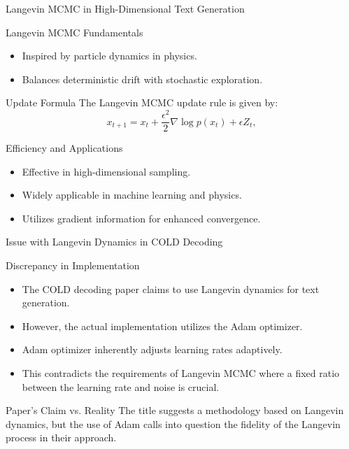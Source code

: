 \documentclass{beamer}
\begin{document}
\begin{frame}{Langevin MCMC in High-Dimensional Text Generation}

    \begin{block}{Langevin MCMC Fundamentals}
        \begin{itemize}
            \item Inspired by particle dynamics in physics.
            \item Balances deterministic drift with stochastic exploration.
        \end{itemize}
    \end{block}

    \begin{block}{Update Formula}
        The Langevin MCMC update rule is given by:
        \begin{equation}
            x_{t+1} = x_t + \frac{\epsilon^2}{2} \nabla \log p(x_t) + \epsilon Z_t,
        \end{equation}
    \end{block}

    \begin{block}{Efficiency and Applications}
        \begin{itemize}
            \item Effective in high-dimensional sampling.
            \item Widely applicable in machine learning and physics.
            \item Utilizes gradient information for enhanced convergence.
        \end{itemize}
    \end{block}
\end{frame}

\begin{frame}{Issue with Langevin Dynamics in COLD Decoding}
    \begin{block}{Discrepancy in Implementation}
        \begin{itemize}
            \item The COLD decoding paper claims to use Langevin dynamics for text generation.
            \item However, the actual implementation utilizes the Adam optimizer.
            \item Adam optimizer inherently adjusts learning rates adaptively.
            \item This contradicts the requirements of Langevin MCMC where a fixed ratio between the learning rate and noise is crucial.

        \end{itemize}
    \end{block}

    \begin{block}{Paper's Claim vs. Reality}
        The title suggests a methodology based on Langevin dynamics, but the use of Adam calls into question the fidelity of the Langevin process in their approach.
    \end{block}
\end{frame}
\end{document}
